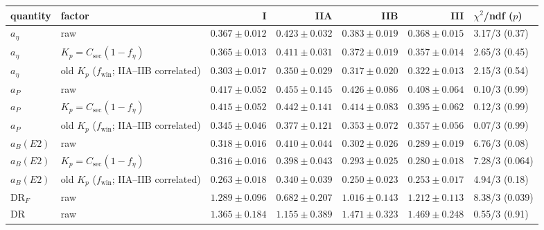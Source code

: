 \begin{tabular}{llrrrrl}
\toprule
quantity & factor & I & IIA & IIB & III & $\chi^2$/ndf ($p$) \\
\midrule
$a_\eta$ & raw & $0.367\pm0.012$ & $0.423\pm0.032$ & $0.383\pm0.019$ & $0.368\pm0.015$ & 3.17/3 (0.37) \\
$a_\eta$ & $K_p=C_\mathrm{sec}(1-f_\eta)$ & $0.365\pm0.013$ & $0.411\pm0.031$ & $0.372\pm0.019$ & $0.357\pm0.014$ & 2.65/3 (0.45) \\
$a_\eta$ & old $K_p$ ($f_\mathrm{win}$; IIA--IIB correlated) & $0.303\pm0.017$ & $0.350\pm0.029$ & $0.317\pm0.020$ & $0.322\pm0.013$ & 2.15/3 (0.54) \\
$a_P$ & raw & $0.417\pm0.052$ & $0.455\pm0.145$ & $0.426\pm0.086$ & $0.408\pm0.064$ & 0.10/3 (0.99) \\
$a_P$ & $K_p=C_\mathrm{sec}(1-f_\eta)$ & $0.415\pm0.052$ & $0.442\pm0.141$ & $0.414\pm0.083$ & $0.395\pm0.062$ & 0.12/3 (0.99) \\
$a_P$ & old $K_p$ ($f_\mathrm{win}$; IIA--IIB correlated) & $0.345\pm0.046$ & $0.377\pm0.121$ & $0.353\pm0.072$ & $0.357\pm0.056$ & 0.07/3 (0.99) \\
$a_B(E2)$ & raw & $0.318\pm0.016$ & $0.410\pm0.044$ & $0.302\pm0.026$ & $0.289\pm0.019$ & 6.76/3 (0.08) \\
$a_B(E2)$ & $K_p=C_\mathrm{sec}(1-f_\eta)$ & $0.316\pm0.016$ & $0.398\pm0.043$ & $0.293\pm0.025$ & $0.280\pm0.018$ & 7.28/3 (0.064) \\
$a_B(E2)$ & old $K_p$ ($f_\mathrm{win}$; IIA--IIB correlated) & $0.263\pm0.018$ & $0.340\pm0.039$ & $0.250\pm0.023$ & $0.253\pm0.017$ & 4.94/3 (0.18) \\
DR$_F$ & raw & $1.289\pm0.096$ & $0.682\pm0.207$ & $1.016\pm0.143$ & $1.212\pm0.113$ & 8.38/3 (0.039) \\
DR & raw & $1.365\pm0.184$ & $1.155\pm0.389$ & $1.471\pm0.323$ & $1.469\pm0.248$ & 0.55/3 (0.91) \\
\bottomrule
\end{tabular}
